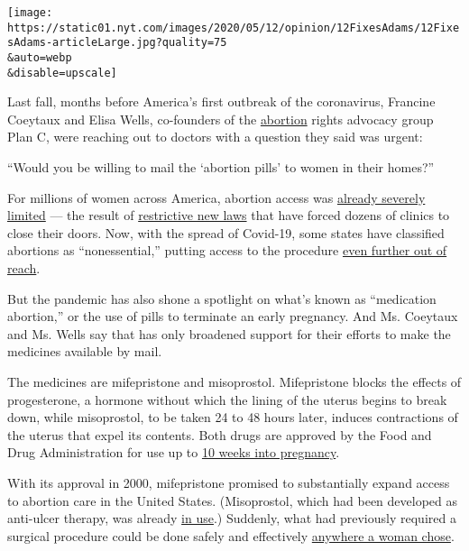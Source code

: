 \texttt{[image: https://static01.nyt.com/images/2020/05/12/opinion/12FixesAdams/12FixesAdams-articleLarge.jpg?quality=75\\\&auto=webp\\\&disable=upscale]}

Last fall, months before America's first outbreak of the coronavirus,
Francine Coeytaux and Elisa Wells, co-founders of the
\href{https://www.nytimes.com/2020/06/29/us/abortion-supreme-court.html}{abortion}
rights advocacy group Plan C, were reaching out to doctors with a
question they said was urgent:

``Would you be willing to mail the `abortion pills' to women in their
homes?''

For millions of women across America, abortion access was
\href{https://www.nytimes.com/interactive/2019/05/31/us/abortion-clinics-map.html}{already
severely limited} --- the result of
\href{https://www.nytimes.com/2019/05/29/us/louisiana-abortion-heartbeat-bill.html}{restrictive
new laws} that have forced dozens of clinics to close their doors. Now,
with the spread of Covid-19, some states have classified abortions as
``nonessential,'' putting access to the procedure
\href{https://www.nytimes.com/2020/03/23/us/coronavirus-texas-ohio-abortion.html}{even
further out of reach}.

But the pandemic has also shone a spotlight on what's known as
``medication abortion,'' or the use of pills to terminate an early
pregnancy. And Ms. Coeytaux and Ms. Wells say that has only broadened
support for their efforts to make the medicines available by mail.

The medicines are mifepristone and misoprostol. Mifepristone blocks the
effects of progesterone, a hormone without which the lining of the
uterus begins to break down, while misoprostol, to be taken 24 to 48
hours later, induces contractions of the uterus that expel its contents.
Both drugs are approved by the Food and Drug Administration for use up
to
\href{https://www.nytimes.com/2016/03/31/health/abortion-pill-mifeprex-ru-486-fda.html}{10
weeks into pregnancy}.

With its approval in 2000, mifepristone promised to substantially expand
access to abortion care in the United States. (Misoprostol, which had
been developed as anti-ulcer therapy, was already
\href{https://www.nytimes.com/2016/06/28/opinion/from-uruguay-a-model-for-making-abortion-safer.html}{in
use}.) Suddenly, what had previously required a surgical procedure could
be done safely and effectively
\href{https://www.guttmacher.org/journals/psrh/2004/01/convincing-new-providers-offer-medical-abortion-what-will-it-take}{anywhere
a woman chose}.

